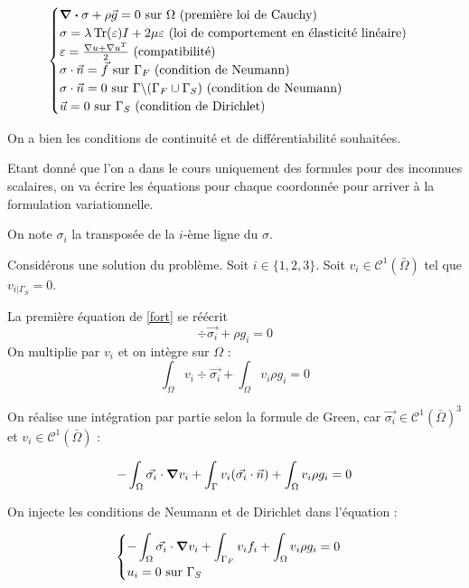 \begin{equation}\label{fort}
    \begin{cases}
      \div \sigma + \rho \vec{g} = 0 \textrm { sur $\Omega$ (première loi de Cauchy)} \\
      \sigma = \lambda \operatorname{Tr} (\varepsilon) I + 2 \mu \varepsilon \textrm { (loi de comportement en élasticité linéaire)} \\
      \varepsilon=\frac{\nabla u + \nabla u^T }{2} \textrm { (compatibilité)} \\
      \sigma \cdot \vec{n} = \vec{f}\textrm { sur $\Gamma_F$ (condition de Neumann)} \\
      \sigma \cdot \vec{n} = 0\textrm { sur $\Gamma \backslash (\Gamma_F \cup \Gamma_S) $ (condition de Neumann)} \\
      \vec{u} = 0 \textrm { sur $\Gamma_S$ (condition de Dirichlet)} \\
      
    \end{cases}
\end{equation}

On a bien les conditions de continuité et de différentiabilité souhaitées. %

Etant donné que l'on a dans le cours uniquement des formules pour des inconnues scalaires, on va écrire les équations pour chaque coordonnée pour arriver à la formulation variationnelle.

On note $\sigma_i$ la transposée de la $i$-ème ligne du $\sigma$.

Considérons une solution du problème.
Soit $i \in \{1,2,3\}$.
Soit $v_i \in \mathcal{C}^1(\bar{\Omega})$ tel que $v_{i|\Gamma_S} = 0$.


La première équation de \eqref{fort} se réécrit 
$$\div \vec{\sigma_i} + \rho g_i = 0$$
On multiplie par $v_i$ et on intègre sur $\Omega$ :
$$\int_\Omega v_i \div \vec{\sigma_i} +  \int_\Omega v_i \rho g_i = 0$$

On réalise une intégration par partie selon la formule de Green, car $\vec{\sigma_i} \in \mathcal{C}^1(\bar{\Omega})^3$ et $v_i \in \mathcal{C}^1(\bar{\Omega})$ :

$$-\int_{\Omega} \vec{\sigma_i} \cdot \grad v_i + \int_{\Gamma} v_i (\vec{\sigma_i} \cdot \vec{n}) + \int_\Omega v_i \rho g_i = 0$$

On injecte les conditions de Neumann et de Dirichlet dans l'équation : %

\begin{equation}
    \begin{cases}
        -\displaystyle\int_{\Omega} \vec{\sigma_i} \cdot \grad v_i + \int_{\Gamma_F} v_i f_i + \int_\Omega v_i \rho g_i = 0\\
        u_i = 0 \textrm{ sur } \Gamma_S
    \end{cases}
\end{equation}

